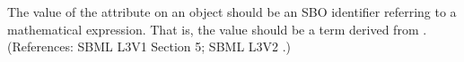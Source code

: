 The value of the attribute  on an \EventAssignment object
should be an SBO identifier referring to a mathematical expression.  That
is, the value should be a term derived from \sbomathformula.  (References:
SBML L3V1 Section 5; SBML L3V2 .)
